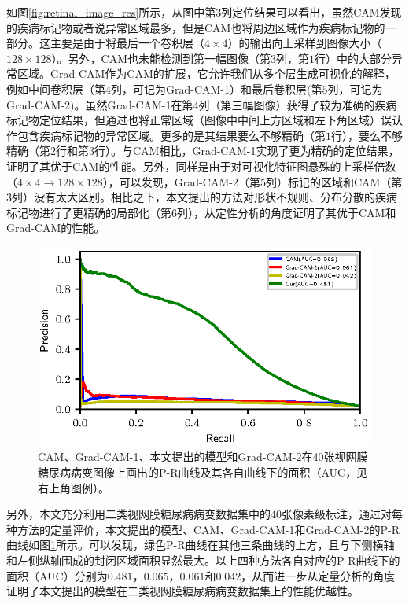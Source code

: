 \noindent 如图\ref{fig:retinal_image_res}所示，从图中第$3$列定位结果可以看出，虽然CAM发现的疾病标记物或者说异常区域最多，但是CAM也将周边区域作为疾病标记物的一部分。这主要是由于将最后一个卷积层（$4\times 4$）的输出向上采样到图像大小（$128\times 128$）。另外，CAM也未能检测到第一幅图像（第$3$列，第$1$行）中的大部分异常区域。Grad-CAM作为CAM的扩展，它允许我们从多个层生成可视化的解释，例如中间卷积层（第$4$列，可记为Grad-CAM-1）和最后卷积层(第$5$列，可记为Grad-CAM-2)。虽然Grad-CAM-1在第$4$列（第三幅图像）获得了较为准确的疾病标记物定位结果，但通过也将正常区域（图像中中间上方区域和左下角区域）误认作包含疾病标记物的异常区域。更多的是其结果要么不够精确（第$1$行），要么不够精确（第$2$行和第$3$行）。与CAM相比，Grad-CAM-1实现了更为精确的定位结果，证明了其优于CAM的性能。另外，同样是由于对可视化特征图悬殊的上采样倍数（$4\times 4 \rightarrow 128\times 128$），可以发现，Grad-CAM-2（第$5$列）标记的区域和CAM（第$3$列）没有太大区别。相比之下，本文提出的方法对形状不规则、分布分散的疾病标记物进行了更精确的局部化（第$6$列），从定性分析的角度证明了其优于CAM和Grad-CAM的性能。

\begin{figure}[h]
	\centering
	\includegraphics[width=1.0\textwidth]{figure/pr_curve_retinal_image/pr_curve.eps}
	\caption{CAM、Grad-CAM-1、本文提出的模型和Grad-CAM-2在40张视网膜糖尿病病变图像上画出的P-R曲线及其各自曲线下的面积（AUC，见右上角图例）。} 
	\label{fig:retinal_image_pr_curve}
\end{figure}

另外，本文充分利用二类视网膜糖尿病病变数据集中的$40$张像素级标注，通过对每种方法的定量评价，本文提出的模型、CAM、Grad-CAM-1和Grad-CAM-2的P-R曲线如图\ref{fig:retinal_image_pr_curve}所示。可以发现，绿色P-R曲线在其他三条曲线的上方，且与下侧横轴和左侧纵轴围成的封闭区域面积显然最大。以上四种方法各自对应的P-R曲线下的面积（AUC）分别为$0.481$，$0.065$，$0.061$和$0.042$，从而进一步从定量分析的角度证明了本文提出的模型在二类视网膜糖尿病病变数据集上的性能优越性。

